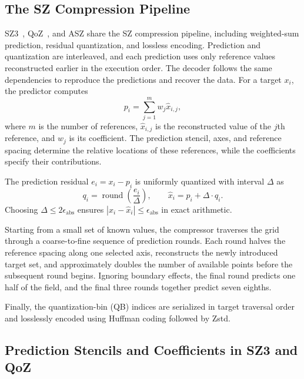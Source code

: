 \subsection{The SZ Compression Pipeline}
\label{sec:background:pipeline}

SZ3~\cite{zhao2021optimizing,liang2022sz3}, QoZ~\cite{liu2022dynamic,liu2024high}, and ASZ share the SZ compression pipeline, including weighted-sum prediction, residual quantization, and lossless encoding. Prediction and quantization are interleaved, and each prediction uses only reference values reconstructed earlier in the execution order. The decoder follows the same dependencies to reproduce the predictions and recover the data. For a target $x_i$, the predictor computes
\begin{equation}
\label{eq:background:prediction}
p_i=\sum_{j=1}^{m}w_j\hat x_{i,j},
\end{equation}
where $m$ is the number of references, $\hat x_{i,j}$ is the reconstructed value of the $j$th reference, and $w_j$ is its coefficient. The prediction stencil, axes, and reference spacing determine the relative locations of these references, while the coefficients specify their contributions.

The prediction residual $e_i=x_i-p_i$ is uniformly quantized with interval $\Delta$ as
\begin{equation}
\label{eq:background:quantization}
q_i=\operatorname{round}\!\left(\frac{e_i}{\Delta}\right),\qquad \hat x_i=p_i+\Delta\cdot q_i.
\end{equation}
Choosing $\Delta\leq2\epsilon_{\mathrm{abs}}$ ensures $|x_i-\hat x_i|\leq\epsilon_{\mathrm{abs}}$ in exact arithmetic.

Starting from a small set of known values, the compressor traverses the grid through a coarse-to-fine sequence of prediction rounds. Each round halves the reference spacing along one selected axis, reconstructs the newly introduced target set, and approximately doubles the number of available points before the subsequent round begins. Ignoring boundary effects, the final round predicts one half of the field, and the final three rounds together predict seven eighths.

Finally, the quantization-bin (QB) indices are serialized in target traversal order and losslessly encoded using Huffman coding followed by Zstd.

\subsection{Prediction Stencils and Coefficients in SZ3 and QoZ}
\label{sec:background:stencils}

